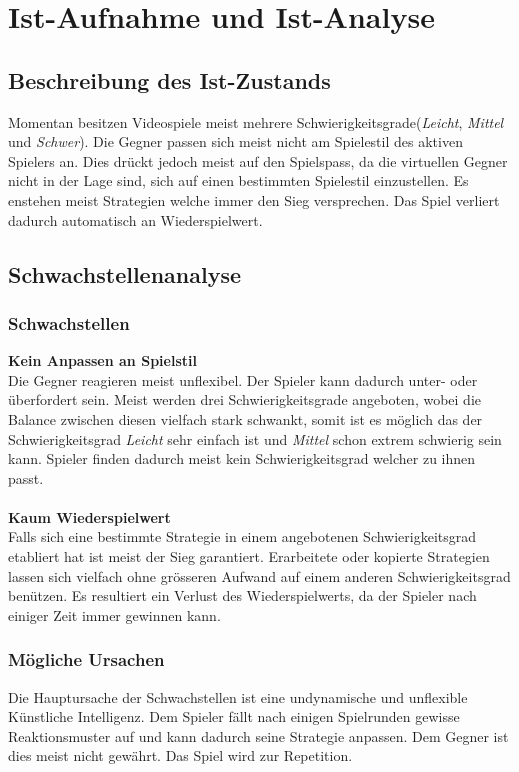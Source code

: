 \section{Ist-Aufnahme und Ist-Analyse}
\subsection{Beschreibung des Ist-Zustands}
Momentan besitzen Videospiele meist mehrere Schwierigkeitsgrade(\emph{Leicht}, \emph{Mittel} und \emph{Schwer}). Die Gegner passen sich meist
nicht am Spielestil des aktiven Spielers an. Dies drückt jedoch meist auf den Spielspass, da die virtuellen Gegner nicht in der 
Lage sind, sich auf einen bestimmten Spielestil einzustellen. Es enstehen meist Strategien welche immer den Sieg versprechen. Das Spiel
verliert dadurch automatisch an Wiederspielwert.
\subsection{Schwachstellenanalyse}
\subsubsection{Schwachstellen}
\textbf{Kein Anpassen an Spielstil}\\
Die Gegner reagieren meist unflexibel. Der Spieler kann dadurch unter- oder überfordert sein. Meist werden drei Schwierigkeitsgrade
angeboten, wobei die Balance zwischen diesen vielfach stark schwankt, somit ist es möglich das der Schwierigkeitsgrad \emph{Leicht} sehr einfach ist und \emph{Mittel} schon extrem schwierig sein kann. Spieler finden dadurch meist kein Schwierigkeitsgrad welcher zu ihnen passt.\\\\
\textbf{Kaum Wiederspielwert}\\
Falls sich eine bestimmte Strategie in einem angebotenen Schwierigkeitsgrad etabliert hat ist meist der Sieg garantiert.
Erarbeitete oder kopierte Strategien lassen sich vielfach ohne grösseren Aufwand auf einem anderen Schwierigkeitsgrad benützen. Es resultiert
ein Verlust des Wiederspielwerts, da der Spieler nach einiger Zeit immer gewinnen kann.
\subsubsection{Mögliche Ursachen}
Die Hauptursache der Schwachstellen ist eine undynamische und unflexible Künstliche Intelligenz. Dem Spieler fällt nach einigen Spielrunden gewisse Reaktionsmuster auf und kann dadurch seine Strategie anpassen. Dem Gegner ist dies meist nicht gewährt. Das Spiel wird zur Repetition.
